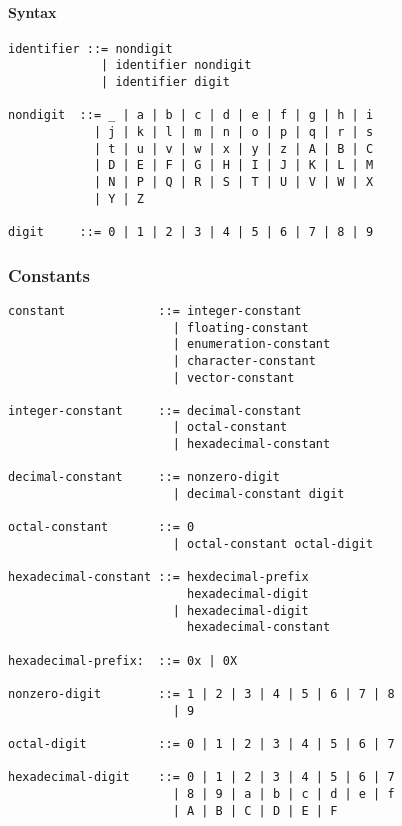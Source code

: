 \documentclass{article}
\begin{document}
\paragraph*{Syntax}
\begin{lstlisting}[language=bnf]
identifier ::= nondigit
             | identifier nondigit
             | identifier digit
             
nondigit  ::= _ | a | b | c | d | e | f | g | h | i 
            | j | k | l | m | n | o | p | q | r | s
            | t | u | v | w | x | y | z | A | B | C
            | D | E | F | G | H | I | J | K | L | M
            | N | P | Q | R | S | T | U | V | W | X
            | Y | Z

digit     ::= 0 | 1 | 2 | 3 | 4 | 5 | 6 | 7 | 8 | 9
\end{lstlisting}

\subsubsection{Constants}
\begin{lstlisting}[language=bnf]
constant             ::= integer-constant
                       | floating-constant
                       | enumeration-constant
                       | character-constant
                       | vector-constant
           
integer-constant     ::= decimal-constant
                       | octal-constant
                       | hexadecimal-constant
                   
decimal-constant     ::= nonzero-digit
                       | decimal-constant digit
                   
octal-constant       ::= 0
                       | octal-constant octal-digit
                   
hexadecimal-constant ::= hexdecimal-prefix
                         hexadecimal-digit
                       | hexadecimal-digit
                         hexadecimal-constant

hexadecimal-prefix:  ::= 0x | 0X

nonzero-digit        ::= 1 | 2 | 3 | 4 | 5 | 6 | 7 | 8
                       | 9
                       
octal-digit          ::= 0 | 1 | 2 | 3 | 4 | 5 | 6 | 7

hexadecimal-digit    ::= 0 | 1 | 2 | 3 | 4 | 5 | 6 | 7
                       | 8 | 9 | a | b | c | d | e | f
                       | A | B | C | D | E | F
\end{lstlisting}
\end{document}
